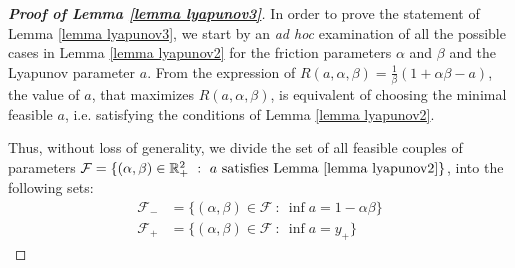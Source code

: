 \documentclass[reqno]{amsart}
\theoremstyle{plain}
\theoremstyle{definition}
\theoremstyle{remark}
\newcommand{\R}{\mathbb{R}}	%
\newcommand{\Fb}{\mathcal{F}}
\begin{document}
\begin{proof}[\textbf{Proof of Lemma \ref{lemma lyapunov3}}]
	
	In order to prove the statement of Lemma \ref{lemma lyapunov3}, we start by an \textit{ad hoc} examination of all the possible cases in Lemma \ref{lemma lyapunov2} for the friction parameters $\alpha$ and $\beta$ and the Lyapunov parameter $a$. From the expression of $R(a,\alpha,\beta) = \frac{1}{\beta}\left(1+\alpha\beta-a\right)$, the value of $a$, that maximizes $R(a,\alpha,\beta)$, is equivalent of choosing the minimal feasible $a$, i.e. satisfying the conditions of Lemma \ref{lemma lyapunov2}.
	
	Thus, without loss of generality, we divide the set of all feasible couples of parameters $\Fb = \{(\alpha,\beta)\in \R_{+}^{2} ~ : ~ a \text{ satisfies Lemma } \ref{lemma lyapunov2}  \}$, into the following sets:
	\begin{align}
		\Fb_{-} &= \{(\alpha,\beta)\in\Fb  ~ : ~ \underset{}{\inf} a = 1-\alpha\beta\}  \label{def Fbmin} \\
		\Fb_{+} &= \{(\alpha,\beta)\in\Fb  ~ : ~ \underset{}{\inf} a = y_{+}\} \label{def Fbplus}
	\end{align}
	
	
	

\end{proof}
\end{document}
